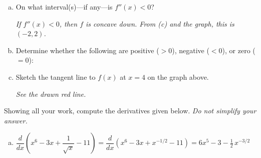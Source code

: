 \documentclass[12pt,letterpaper]{exam}
\begin{document}
\begin{questions}
\begin{enumerate}[(a)]
	{\itshape If $f''(x) > 0$, then $f$ is concave up. From (c) and the graph, this is $(-\infty, -2) \cup (2, \infty)$.} \vfill
	
	\item On what interval(s)---if any---is $f''(x) < 0$? \vfill
	
	{\itshape If $f''(x) < 0$, then $f$ is concave down. From (c) and the graph, this is $(-2, 2)$.} \vfill
	
	\item Determine whether the following are positive ($> 0$), negative ($< 0$), or zero ($= 0$): 
		 \vfill
	\item Sketch the tangent line to $f(x)$ at $x= 4$ on the graph above. \vfill
	
	{\itshape See the drawn red line.} \vfill
	\end{enumerate}



\newpage
\question[15] Showing all your work, compute the derivatives given below. {\itshape Do not simplify your answer.} \pvspace{0.3cm}
	\begin{enumerate}[(a)]
	\item $\dfrac{d}{dx} \left( x^6 - 3x + \dfrac{1}{\sqrt{x}} - 11 \right)= \dfrac{d}{dx} \left( x^6 - 3x + x^{-1/2} - 11 \right)= 6x^5 - 3 - \frac{1}{2}\, x^{-3/2}$ \vfill
	

\end{enumerate}
\end{questions}
\end{document}
